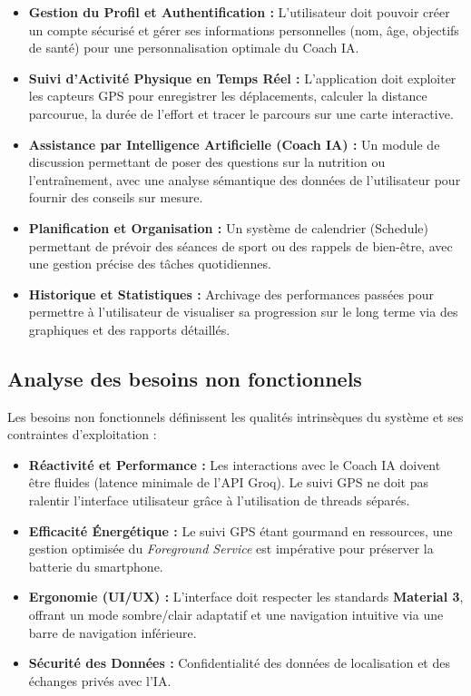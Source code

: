 \documentclass[12pt,a4paper,oneside]{report}
\begin{document}
    \begin{itemize}
        \item \textbf{Gestion du Profil et Authentification :} L'utilisateur doit pouvoir créer un compte sécurisé et gérer ses informations personnelles (nom, âge, objectifs de santé) pour une personnalisation optimale du Coach IA.
        \item \textbf{Suivi d'Activité Physique en Temps Réel :} L'application doit exploiter les capteurs GPS pour enregistrer les déplacements, calculer la distance parcourue, la durée de l'effort et tracer le parcours sur une carte interactive.
        \item \textbf{Assistance par Intelligence Artificielle (Coach IA) :} Un module de discussion permettant de poser des questions sur la nutrition ou l'entraînement, avec une analyse sémantique des données de l'utilisateur pour fournir des conseils sur mesure.
        \item \textbf{Planification et Organisation :} Un système de calendrier (Schedule) permettant de prévoir des séances de sport ou des rappels de bien-être, avec une gestion précise des tâches quotidiennes.
        \item \textbf{Historique et Statistiques :} Archivage des performances passées pour permettre à l'utilisateur de visualiser sa progression sur le long terme via des graphiques et des rapports détaillés.
    \end{itemize}

    \subsection{Analyse des besoins non fonctionnels}

    Les besoins non fonctionnels définissent les qualités intrinsèques du système et ses contraintes d'exploitation :

    \begin{itemize}
        \item \textbf{Réactivité et Performance :} Les interactions avec le Coach IA doivent être fluides (latence minimale de l'API Groq). Le suivi GPS ne doit pas ralentir l'interface utilisateur grâce à l'utilisation de threads séparés.
        \item \textbf{Efficacité Énergétique :} Le suivi GPS étant gourmand en ressources, une gestion optimisée du \textit{Foreground Service} est impérative pour préserver la batterie du smartphone.
        \item \textbf{Ergonomie (UI/UX) :} L'interface doit respecter les standards \textbf{Material 3}, offrant un mode sombre/clair adaptatif et une navigation intuitive via une barre de navigation inférieure.
        \item \textbf{Sécurité des Données :} Confidentialité des données de localisation et des échanges privés avec l'IA.
    \end{itemize}
\end{document}

